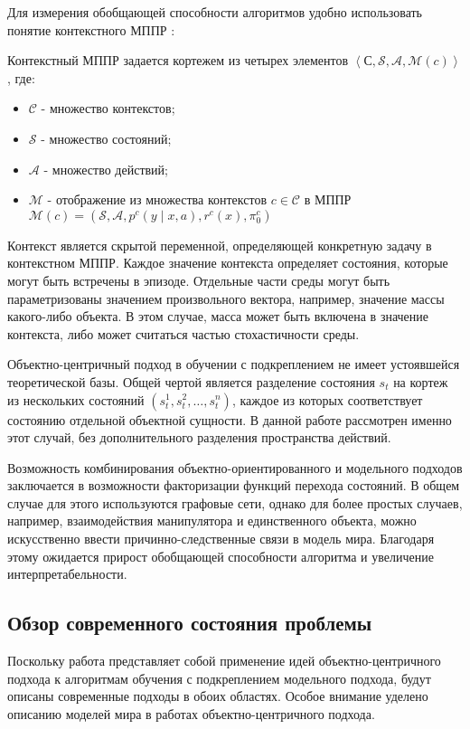 Для измерения обобщающей способности алгоритмов удобно использовать понятие контекстного МППР \cite{CMDP}:
\begin{Def}
    Контекстный МППР задается кортежем из четырех элементов $\left<\mathcal{С}, \mathcal{S}, \mathcal{A}, \mathcal{M}\left(c\right)\right>$, где:
    \begin{itemize}
        \item $\mathcal{C}$ - множество контекстов;
        \item $\mathcal{S}$ - множество состояний;
        \item $\mathcal{A}$ - множество действий;
        \item $\mathcal{M}$ - отображение из множества контекстов $c \in \mathcal{C}$ в МППР $\mathcal{M}(c)=\left(\mathcal{S}, \mathcal{A}, p^{c}(y \mid x, a), r^{c}(x), \pi_{0}^{c}\right)$
    \end{itemize}
    \label{cmdp}
\end{Def}
Контекст является скрытой переменной, определяющей конкретную задачу в контекстном МППР. 
Каждое значение контекста определяет состояния, которые могут быть встречены в эпизоде.
Отдельные части среды могут быть параметризованы значением произвольного вектора, например, значение массы какого-либо объекта. 
В этом случае, масса может быть включена в значение контекста, либо может считаться частью стохастичности среды.

Объектно-центричный подход в обучении с подкреплением не имеет устоявшейся теоретической базы. Общей чертой является разделение состояния $s_t$ на кортеж из нескольких состояний $(s_t^1, s_t^2, \dots, s_t^n)$, каждое из которых соответствует состоянию отдельной объектной сущности. В данной работе рассмотрен именно этот случай, без дополнительного разделения пространства действий. 

Возможность комбинирования объектно-ориентированного и модельного подходов заключается в возможности факторизации функций перехода состояний. В общем случае для этого используются графовые сети, однако для более простых случаев, например, взаимодействия манипулятора и единственного объекта, можно искусственно ввести причинно-следственные связи в модель мира. Благодаря этому ожидается прирост обобщающей способности алгоритма и увеличение интерпретабельности.

\subsection{Обзор современного состояния проблемы}
Поскольку работа представляет собой применение идей объектно-центричного подхода к алгоритмам обучения с подкреплением модельного подхода, будут описаны современные подходы в обоих областях.
Особое внимание уделено описанию моделей мира в работах объектно-центричного подхода.

